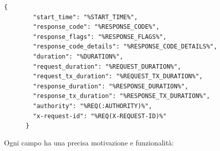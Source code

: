 \begin{lstlisting}[caption={Formato richiesto per l'ottenimento dell'access logging.}, label=lst:access_log_format, keywordstyle=\color{black}, commentstyle=\color{black},stringstyle=\color{black},numberstyle=\color{black}]
{
        "start_time": "%START_TIME%",
        "response_code": "%RESPONSE_CODE%",
        "response_flags": "%RESPONSE_FLAGS%",
        "response_code_details": "%RESPONSE_CODE_DETAILS%",
        "duration": "%DURATION%",
        "request_duration": "%REQUEST_DURATION%",
        "request_tx_duration": "%REQUEST_TX_DURATION%",
        "response_duration": "%RESPONSE_DURATION%",
        "response_tx_duration": "%RESPONSE_TX_DURATION%",
        "authority": "%REQ(:AUTHORITY)%",
        "x-request-id": "%REQ(X-REQUEST-ID)%"
      }
\end{lstlisting}
Ogni campo ha una precisa motivazione e funzionalità:
